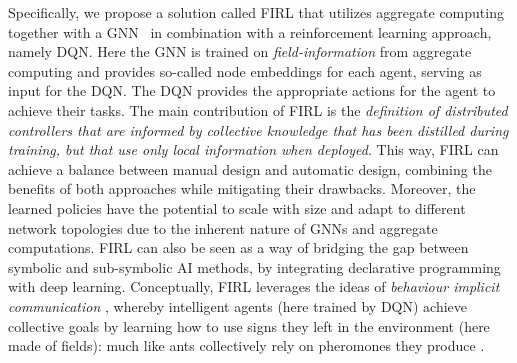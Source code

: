 Specifically, we propose a solution called \ac{FIRL} that utilizes aggregate computing together with a \ac{GNN}~\cite{DBLP:journals/aiopen/ZhouCHZYLWLS20} in combination with a reinforcement learning approach, namely \ac{DQN}. 
 Here the \ac{GNN} is trained on \emph{field-information} from aggregate computing and provides so-called node embeddings for each agent, serving as input for the \ac{DQN}. 
 The \ac{DQN} provides the appropriate actions for the agent to achieve their tasks.
%
The main contribution of \ac{FIRL} is the \emph{definition of distributed controllers that are informed by collective knowledge that has been distilled during training, but that use only local information when deployed}. 
This way, \ac{FIRL} can achieve a balance between manual design and automatic design, combining the benefits of both approaches while mitigating their drawbacks.
Moreover, the learned policies have the potential to scale with size and adapt to different network topologies due to the inherent nature of GNNs and aggregate computations.
\ac{FIRL} can also be seen as a way of bridging the gap between symbolic and sub-symbolic AI methods, by integrating declarative programming with deep learning.
%
Conceptually, \ac{FIRL} leverages the ideas of \emph{behaviour implicit communication} \cite{DBLP:journals/ijaci/CastelfranchiPT10} \cite{DBLP:conf/e4mas/TummoliniCRVO04}, whereby intelligent agents (here trained by DQN) achieve collective goals by learning how to use signs they left in the environment (here made of fields): much like ants collectively rely on pheromones they produce \cite{DBLP:journals/anor/Parunak97}.

